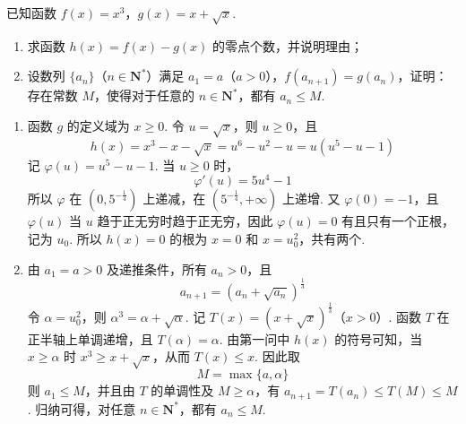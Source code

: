 \begin{problem}
已知函数 \(f(x) = x^3\)，\(g(x) = x + \sqrt{x}\).
\begin{enumerate}
\item 求函数 \( h(x) = f(x) - g(x) \) 的零点个数，并说明理由；
\item 设数列 \(\{a_{n}\}\)（\(n \in \mathbf{N}^{*}\)）满足 \(a_{1} = a\)（\(a > 0\)），\(f(a_{n+1}) = g(a_{n})\)，证明：存在常数 \(M\)，使得对于任意的 \(n \in \mathbf{N}^{*}\)，都有 \(a_{n} \leqslant M\).
\end{enumerate}
\end{problem}

\begin{solution}
\begin{enumerate}
\item 函数 \(g\) 的定义域为 \(x\geqslant0\). 令 \(u=\sqrt{x}\)，则 \(u\geqslant0\)，且
\[
h(x)=x^3-x-\sqrt{x}=u^6-u^2-u=u\left(u^5-u-1\right)
\]
记 \(\varphi(u)=u^5-u-1\). 当 \(u\geqslant0\) 时，
\[
\varphi'(u)=5u^4-1
\]
所以 \(\varphi\) 在 \(\left(0,5^{-\frac{1}{4}}\right)\) 上递减，在 \(\left(5^{-\frac{1}{4}},+\infty\right)\) 上递增. 又 \(\varphi(0)=-1\)，且 \(\varphi(u)\) 当 \(u\) 趋于正无穷时趋于正无穷，因此 \(\varphi(u)=0\) 有且只有一个正根，记为 \(u_0\). 所以 \(h(x)=0\) 的根为 \(x=0\) 和 \(x=u_0^2\)，共有两个.

\item 由 \(a_1=a>0\) 及递推条件，所有 \(a_n>0\)，且
\[
a_{n+1}=\left(a_n+\sqrt{a_n}\right)^{\frac{1}{3}}
\]
令 \(\alpha=u_0^2\)，则 \(\alpha^3=\alpha+\sqrt\alpha\). 记 \(T(x)=\left(x+\sqrt{x}\right)^{\frac{1}{3}}\)（\(x>0\)）.
函数 \(T\) 在正半轴上单调递增，且 \(T(\alpha)=\alpha\). 由第一问中 \(h(x)\) 的符号可知，当 \(x\geqslant\alpha\) 时 \(x^3\geqslant x+\sqrt{x}\)，从而 \(T(x)\leqslant x\). 因此取
\[
M=\max\{a,\alpha\}
\]
则 \(a_1\leqslant M\)，并且由 \(T\) 的单调性及 \(M\geqslant\alpha\)，有 \(a_{n+1}=T(a_n)\leqslant T(M)\leqslant M\). 归纳可得，对任意 \(n\in\mathbf N^*\)，都有 \(a_n\leqslant M\).
\end{enumerate}
\end{solution}
